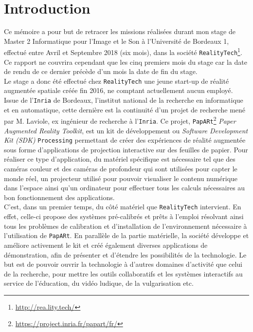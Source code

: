 \chapter{Introduction}
\label{chap:intro}

Ce mémoire a pour but de retracer les missions réalisées durant mon stage de Master 2 Informatique pour l'Image et le Son à l'Université de Bordeaux 1, effectué entre Avril et Septembre 2018 (six mois), dans la société \texttt{RealityTech}\footnote{\href{http://rea.lity.tech/}{http://rea.lity.tech/}}. Ce rapport ne couvrira cependant que les cinq premiers mois du stage car la date de rendu de ce dernier précède d'un mois la date de fin du stage.\\

Le stage a donc été effectué chez \texttt{RealityTech} une jeune start-up de réalité augmentée spatiale créée fin 2016, ne comptant actuellement aucun employé. Issue de l'\texttt{Inria} de Bordeaux, l'institut national de la recherche en informatique et en automatique, cette dernière est la continuité d'un projet de recherche mené par M. Laviole, ex ingénieur de recherche à l'\texttt{Inria}. Ce projet, \texttt{PapARt}\footnote{\href{https://project.inria.fr/papart/fr/}{https://project.inria.fr/papart/fr/}} \emph{Paper Augmented Reality Toolkit}, est un kit de développement ou \emph{Software Development Kit (SDK)} \texttt{Processing} permettant de créer des expériences de réalité augmentée sous forme d'applications de projection interactive sur des feuilles de papier. Pour réaliser ce type d'application, du matériel spécifique est nécessaire tel que des caméras couleur et des caméras de profondeur qui sont utilisées pour capter le monde réel, un projecteur utilisé pour pouvoir visualiser le contenu numérique dans l'espace ainsi qu'un ordinateur pour effectuer tous les calculs nécessaires au bon fonctionnement des applications.\\

C'est, dans un premier temps, du côté matériel que \texttt{RealityTech} intervient. En effet, celle-ci propose des systèmes pré-calibrés et prêts à l'emploi résolvant ainsi tous les problèmes de calibration et d'installation de l'environnement nécessaire à l'utilisation de \texttt{PapARt}. En parallèle de la partie matérielle, la société développe et améliore activement le kit et créé également diverses applications de démonstration, afin de présenter et d'étendre les possibilités de la technologie. Le but est de pouvoir ouvrir la technologie à d'autres domaines d'activité que celui de la recherche, pour mettre les outils collaboratifs et les systèmes interactifs au service de l'éducation, du vidéo ludique, de la vulgarisation etc.

